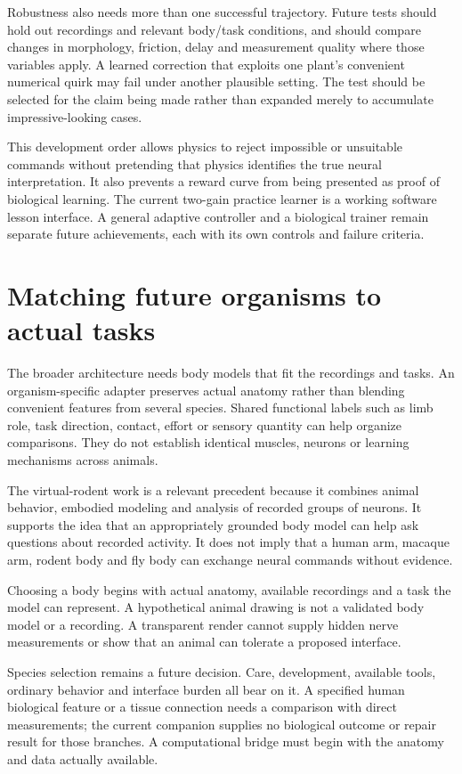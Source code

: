 Robustness also needs more than one successful trajectory. Future tests should hold out recordings and relevant body/task conditions, and should compare changes in morphology, friction, delay and measurement quality where those variables apply. A learned correction that exploits one plant's convenient numerical quirk may fail under another plausible setting. The test should be selected for the claim being made rather than expanded merely to accumulate impressive-looking cases.

This development order allows physics to reject impossible or unsuitable commands without pretending that physics identifies the true neural interpretation. It also prevents a reward curve from being presented as proof of biological learning. The current two-gain practice learner is a working software lesson interface. A general adaptive controller and a biological trainer remain separate future achievements, each with its own controls and failure criteria.

\section{Matching future organisms to actual tasks}

The broader architecture needs body models that fit the recordings and tasks. An organism-specific adapter preserves actual anatomy rather than blending convenient features from several species. Shared functional labels such as limb role, task direction, contact, effort or sensory quantity can help organize comparisons. They do not establish identical muscles, neurons or learning mechanisms across animals.

The virtual-rodent work is a relevant precedent because it combines animal behavior, embodied modeling and analysis of recorded groups of neurons. It supports the idea that an appropriately grounded body model can help ask questions about recorded activity. It does not imply that a human arm, macaque arm, rodent body and fly body can exchange neural commands without evidence.\cite{virtualrodent2024}

Choosing a body begins with actual anatomy, available recordings and a task the model can represent. A hypothetical animal drawing is not a validated body model or a recording. A transparent render cannot supply hidden nerve measurements or show that an animal can tolerate a proposed interface.

Species selection remains a future decision. Care, development, available tools, ordinary behavior and interface burden all bear on it. A specified human biological feature or a tissue connection needs a comparison with direct measurements; the current companion supplies no biological outcome or repair result for those branches. A computational bridge must begin with the anatomy and data actually available.

